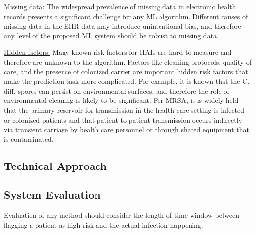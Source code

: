 \underline{Missing data:}  The widespread prevalence of missing data in electronic health records presents a significant challenge for any ML algorithm. Different causes of missing data in the EHR data may introduce unintentional bias, and therefore any level of the proposed ML system should be robust to missing data.

\underline{Hidden factors:} Many known risk factors for HAIs are hard to measure and therefore are unknown to the algorithm. Factors like cleaning protocols, quality of care, and the presence of colonized carrier are important hidden risk factors that make the prediction task more complicated.  For example, it is known that the C. diff. spores can persist on environmental surfaces, and therefore the role of environmental cleaning is likely to be significant. For MRSA, it is widely held that the primary reservoir for transmission in the health care setting is infected or colonized patients and that patient-to-patient transmission occurs indirectly via transient carriage by health care personnel or through shared equipment that is contaminated.





\subsection{Technical Approach}


\subsection{System Evaluation}
Evaluation of any method should consider the length of time window between flagging a patient as high risk and the actual infection happening.

